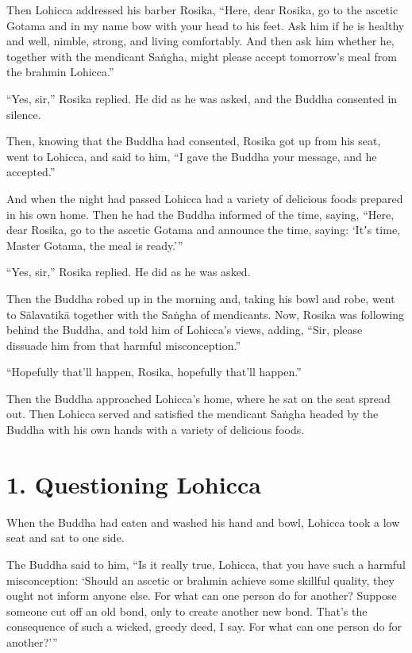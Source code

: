 \documentclass[12pt,openany]{book}%
\begin{document}
Then Lohicca addressed his barber Rosika, “Here, dear Rosika, go to the ascetic Gotama and in my name bow with your head to his feet. Ask him if he is healthy and well, nimble, strong, and living comfortably. And then ask him whether he, together with the mendicant \textsanskrit{Saṅgha}, might please accept tomorrow’s meal from the brahmin Lohicca.” 

“Yes, sir,” Rosika replied. He did as he was asked, and the Buddha consented in silence. 

Then, knowing that the Buddha had consented, Rosika got up from his seat, went to Lohicca, and said to him, “I gave the Buddha your message, and he accepted.” 

And when the night had passed Lohicca had a variety of delicious foods prepared in his own home. Then he had the Buddha informed of the time, saying, “Here, dear Rosika, go to the ascetic Gotama and announce the time, saying: ‘Itʼs time, Master Gotama, the meal is ready.’” 

“Yes, sir,” Rosika replied. He did as he was asked. 

Then the Buddha robed up in the morning and, taking his bowl and robe, went to \textsanskrit{Sālavatikā} together with the \textsanskrit{Saṅgha} of mendicants. Now, Rosika was following behind the Buddha, and told him of Lohicca’s views, adding, “Sir, please dissuade him from that harmful misconception.” 

“Hopefully that’ll happen, Rosika, hopefully that’ll happen.” 

Then the Buddha approached Lohicca’s home, where he sat on the seat spread out. Then Lohicca served and satisfied the mendicant \textsanskrit{Saṅgha} headed by the Buddha with his own hands with a variety of delicious foods. 

\section*{1. Questioning Lohicca }

When the Buddha had eaten and washed his hand and bowl, Lohicca took a low seat and sat to one side. 

The Buddha said to him, “Is it really true, Lohicca, that you have such a harmful misconception: ‘Should an ascetic or brahmin achieve some skillful quality, they ought not inform anyone else. For what can one person do for another? Suppose someone cut off an old bond, only to create another new bond. That’s the consequence of such a wicked, greedy deed, I say. For what can one person do for another?’” 
\end{document}
